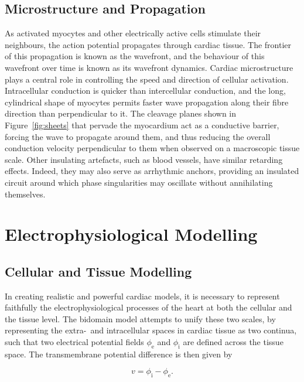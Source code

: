   \subsection{Microstructure and Propagation}
  \label{sub:microstructure_and_propagation}
    As activated myocytes and other electrically active cells stimulate their neighbours, the action potential propagates through cardiac tissue. The frontier of this propagation is known as the wavefront, and the behaviour of this wavefront over time is known as its wavefront dynamics. Cardiac microstructure plays a central role in controlling the speed and direction of cellular activation. Intracellular conduction is quicker than intercellular conduction, and the long, cylindrical shape of myocytes permits faster wave propagation along their fibre direction than perpendicular to it. The cleavage planes shown in Figure~\ref{fig:sheets} that pervade the myocardium act as a conductive barrier, forcing the wave to propagate around them, and thus reducing the overall conduction velocity perpendicular to them when observed on a macroscopic tissue scale. Other insulating artefacts, such as blood vessels, have similar retarding effects. Indeed, they may also serve as arrhythmic anchors, providing an insulated circuit around which phase singularities may oscillate without annihilating themselves.
    
\section{Electrophysiological Modelling}
\label{sec:electrophysiological_modelling}
  \subsection{Cellular and Tissue Modelling}
  \label{sub:cellular_and_tissue_modelling}
    In creating realistic and powerful cardiac models, it is necessary to represent faithfully the electrophysiological processes of the heart at both the cellular and the tissue level. The bidomain model attempts to unify these two scales, by representing the extra-~and intracellular spaces in cardiac tissue as two continua, such that two electrical potential fields $\phi_\text{e}$ and $\phi_\text{i}$ are defined across the tissue space. The transmembrane potential difference is then given by
  
    \begin{equation}
      v = \phi_\text{i} - \phi_\text{e}.
    \end{equation}
  
